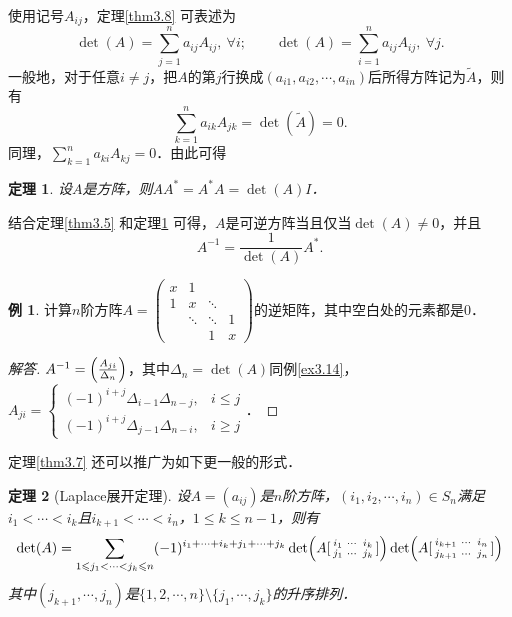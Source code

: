 \documentclass[a4paper,fontset=windows]{ctexbook}
\newtheorem{theorem}{定理}[chapter]
\theoremstyle{definition}
\newtheorem{example}{例}[chapter]
\renewcommand{\le}{\leqslant}
\renewcommand{\ge}{\geqslant}
\begin{document}
使用记号$A_{ij}$，定理\ref{thm3.8} 可表述为
$$\det(A)=\sum_{j=1}^na_{ij}A_{ij},~\forall i;\qquad\det(A)=\sum_{i=1}^na_{ij}A_{ij},~\forall j.$$
一般地，对于任意$i\ne j$，把$A$的第$j$行换成$(a_{i1},a_{i2},\cdots,a_{in})$后所得方阵记为$\widetilde{A}$，则有
$$\sum_{k=1}^na_{ik}A_{jk}=\det(\widetilde{A})=0.$$
同理，$\sum\limits_{k=1}^na_{ki}A_{kj}=0$．由此可得

\begin{theorem}\label{thm3.9}
设$A$是方阵，则$AA^*=A^*A=\det(A)I$．
\end{theorem}

结合定理\ref{thm3.5} 和定理\ref{thm3.9} 可得，$A$是可逆方阵当且仅当$\det(A)\ne 0$，并且
\begin{equation}\label{eq3.4}
A^{-1}=\frac{1}{\det(A)}A^*.
\end{equation}

\begin{example}
计算$n$阶方阵$A=\begin{pmatrix}x&1&& \\ 1&x&\ddots& \\ &\ddots&\ddots&1 \\ &&1&x\end{pmatrix}$的逆矩阵，其中空白处的元素都是0．
\end{example}

\begin{proof}[解答]
$A^{-1}=\Bigl(\frac{A_{ji}}{\Delta_n}\Bigr)$，其中$\Delta_n=\det(A)$同例\ref{ex3.14}，$A_{ji}=\begin{cases}(-1)^{i+j}\Delta_{i-1}\Delta_{n-j},&i\le j \\ (-1)^{i+j}\Delta_{j-1}\Delta_{n-i},&i\ge j\end{cases}$．
\end{proof}

定理\ref{thm3.7} 还可以推广为如下更一般的形式．

\begin{theorem}[Laplace展开定理]
设$A=(a_{ij})$是$n$阶方阵，$(i_1,i_2,\cdots,i_n)\in S_n$满足$i_1<\cdots<i_k$且$i_{k+1}<\cdots<i_n$，$1\le k\le n-1$，则有
$$\det(A)=\sum_{1\le j_1<\cdots<j_k\le n}(-1)^{i_1+\cdots+i_k+j_1+\cdots+j_k}\det\Bigl(A[\begin{smallmatrix}i_1&\cdots&i_k \\ j_1&\cdots&j_k\end{smallmatrix}]\Bigr)\det\Bigl(A[\begin{smallmatrix}i_{k+1}&\cdots&i_n \\ j_{k+1}&\cdots&j_n\end{smallmatrix}]\Bigr)$$
其中$(j_{k+1},\cdots,j_n)$是$\{1,2,\cdots,n\}\setminus\{j_1,\cdots,j_k\}$的升序排列．
\end{theorem}
\end{document}
